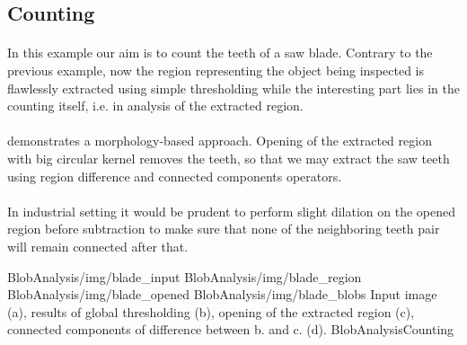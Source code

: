 \subsection{Counting}

\paragraph*{}
In this example our aim is to count the teeth of a saw blade. Contrary to the previous example, now the region representing the object being inspected is flawlessly extracted using simple thresholding while the interesting part lies in the counting itself, i.e. in analysis of the extracted region.

\paragraph*{}
 demonstrates a morphology-based approach. Opening of the extracted region with big circular kernel removes the teeth, so that we may extract the saw teeth using region difference and connected components operators.

\paragraph*{}
In industrial setting it would be prudent to perform slight dilation on the opened region before subtraction to make sure that none of the neighboring teeth pair will remain connected after that.

\fourFigures
{BlobAnalysis/img/blade_input}
{BlobAnalysis/img/blade_region}
{BlobAnalysis/img/blade_opened}
{BlobAnalysis/img/blade_blobs}
{Input image (a), results of global thresholding (b), opening of the extracted region (c), connected components of difference between b. and c. (d).}
{BlobAnalysisCounting}
{\basicWidth}